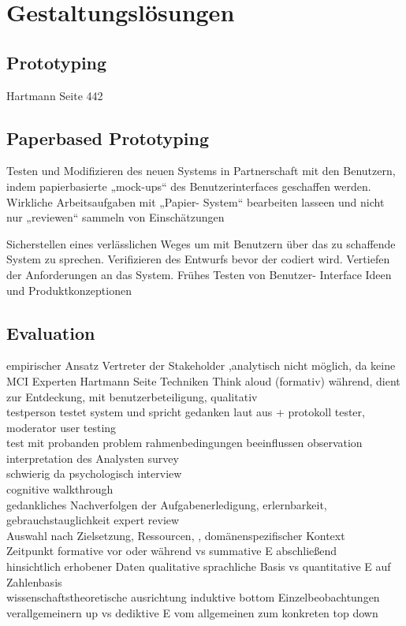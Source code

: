 
\section{Gestaltungslösungen}


\subsection{Prototyping}

Hartmann Seite 442

\subsection{Paperbased Prototyping}

Testen und Modifizieren des neuen Systems in Partnerschaft mit den Benutzern, indem papierbasierte „mock-ups“ des Benutzerinterfaces geschaffen werden. Wirkliche Arbeitsaufgaben mit „Papier- System“ bearbeiten lasseen und nicht nur „reviewen“ sammeln von Einschätzungen

Sicherstellen eines verlässlichen Weges um mit Benutzern über das zu schaffende System zu sprechen. Verifizieren des Entwurfs bevor der codiert wird. Vertiefen der Anforderungen an das System. Frühes Testen von Benutzer- Interface Ideen und Produktkonzeptionen

\subsection{Evaluation}

empirischer Ansatz
Vertreter der Stakeholder ,analytisch nicht möglich, da keine MCI Experten
Hartmann Seite 
Techniken
Think aloud (formativ) während, dient zur Entdeckung, mit benutzerbeteiligung, qualitativ\\
testperson testet system und spricht gedanken laut aus + protokoll
tester, moderator
user testing\\
test mit probanden
problem rahmenbedingungen beeinflussen
observation\\
interpretation des Analysten
survey\\
schwierig da psychologisch
interview\\
cognitive walkthrough\\
	gedankliches Nachverfolgen der Aufgabenerledigung, erlernbarkeit, gebrauchstauglichkeit
expert review\\

Auswahl nach Zielsetzung, Ressourcen, , domänenspezifischer Kontext\\
Zeitpunkt
formative vor oder während vs summative E abschließend\\
hinsichtlich erhobener Daten
qualitative sprachliche Basis vs quantitative E auf Zahlenbasis\\
wissenschaftstheoretische ausrichtung
induktive bottom Einzelbeobachtungen verallgemeinern up vs dediktive E vom allgemeinen zum konkreten top down\\

